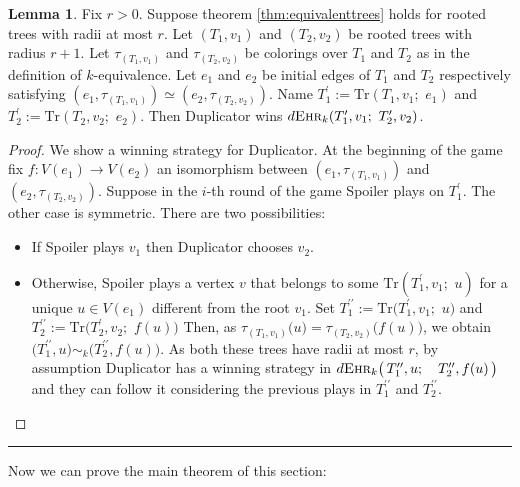 \documentclass[12pt,notitlepage,a4paper]{article}
\theoremstyle{definition}
\newtheorem{lemma}{Lemma}[section]
\newcommand{\ehr}{\textsc{Ehr}}
\begin{document}
\begin{lemma} \label{lem:equivalentedges}
	Fix $r>0$. Suppose theorem \ref{thm:equivalenttrees}
	holds for rooted trees with radii at most $r$.
	Let $(T_1,v_1)$ and $(T_2,v_2)$ be rooted trees with radius
	$r+1$. Let $\tau_{(T_1,v_1)}$ and $\tau_{(T_2,v_2)}$
	be colorings over $T_1$ and $T_2$ as in the
	definition of $k$-equivalence. 
	Let $e_1$ and $e_2$ be initial edges 
	of $T_1$ and $T_2$ respectively satisfying 
	$(e_1,\tau_{(T_1,v_1)})\simeq (e_2,\tau_{(T_2,v_2)})$. Name 
	$T^\prime_1:=\mathrm{Tr}(T_1,v_1; \,\,e_1)$ and 
	$T^\prime_2:=\mathrm{Tr}(T_2,v_2;\,\,e_2)$. Then
	Duplicator wins 
	$d\ehr_{k}(T^\prime_1, v_1; \, \, T^\prime_2,v_2)$.
\end{lemma}
\begin{proof}
	We show a winning strategy for Duplicator.
	At the beginning of the game fix 
	$f:V(e_1)\rightarrow V(e_2)$ an isomorphism between 
	$(e_1,\tau_{(T_1,v_1)})$
	and $(e_2,\tau_{(T_2,v_2)})$.
	Suppose in the $i$-th round of the game Spoiler
	plays on $T^\prime_1$. The other case is symmetric. 
	There are two possibilities:
	\begin{itemize}[leftmargin=*]
		\item If Spoiler plays $v_1$ 
		then Duplicator chooses $v_2$. 
		\item Otherwise, Spoiler plays a vertex $v$ that belongs
		to some $\mathrm{Tr}(T^\prime_1,v_1;\,\, u)$ for a unique $u\in V(e_1)$
		different from the root $v_1$. 
		Set $T^{\prime\prime}_1:=
		\mathrm{Tr}\big(T^\prime_1,v_1;\,\, u\big)$
		and
		$T^{\prime\prime}_2:=\mathrm{Tr}\big(T^\prime_2,v_2;\,\, f(u)\big)$
		Then, as $\tau_{(T_1,v_1)}\big(u\big)=\tau_{(T_2,v_2)}\big(f(u)\big)$,
		we obtain
		$\big(T^{\prime\prime}_1,u\big) \sim_k 
		\big(T^{\prime \prime}_2,f(u)\big)$.
		As both these trees have radii at most $r$, 
		by assumption Duplicator has a winning 
		strategy in
		$d\ehr_{k}\big(\,T^{\prime\prime}_1, u;
		\quad T^{\prime \prime}_2, f(u)\,  \big)$		
		and they can follow it considering the previous plays in
		$T^{\prime\prime}_1$ and $T^{\prime\prime}_2$.	
	\end{itemize}
\end{proof}
\noindent\rule{2cm}{0.4pt}

Now we can prove the main theorem of this section:
\end{document}
